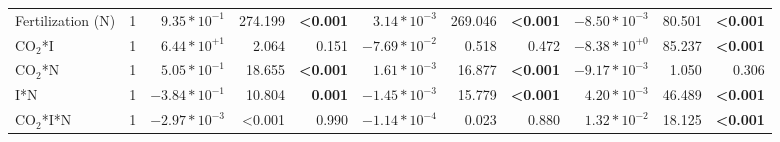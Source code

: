 \begin{landscape}
\begin{table}
{\begin{tabular}{p{3cm}p{0.5cm}p{1.75cm}p{1.5cm}p{1.5cm}p{1.75cm}p{1.5cm}p{1.5cm}p{1.75cm}p{1.5cm}p{1.5cm}}
            Fertilization (N) & \multicolumn{1}{r}{1}
            & \multicolumn{1}{r}{$9.35*10^{-1}$}      & \multicolumn{1}{r}{274.199}       & \multicolumn{1}{r}{\textbf{<0.001}}
            & \multicolumn{1}{r}{$3.14*10^{-3}$}      & \multicolumn{1}{r}{269.046}       & \multicolumn{1}{r}{\textbf{<0.001}}
            & \multicolumn{1}{r}{$-8.50*10^{-3}$}     & \multicolumn{1}{r}{80.501}        & \multicolumn{1}{r}{\textbf{<0.001}} 
            \\

            CO$_2$*I & \multicolumn{1}{r}{1}
            & \multicolumn{1}{r}{$6.44*10^{+1}$}      & \multicolumn{1}{r}{2.064}         & \multicolumn{1}{r}{0.151}
            & \multicolumn{1}{r}{$-7.69*10^{-2}$}   & \multicolumn{1}{r}{0.518}         & \multicolumn{1}{r}{0.472}
            & \multicolumn{1}{r}{$-8.38*10^{+0}$}     & \multicolumn{1}{r}{85.237}        & \multicolumn{1}{r}{\textbf{<0.001}} 
            \\

            CO$_2$*N & \multicolumn{1}{r}{1}
            & \multicolumn{1}{r}{$5.05*10^{-1}$}      & \multicolumn{1}{r}{18.655}        & \multicolumn{1}{r}{\textbf{<0.001}}
            & \multicolumn{1}{r}{$1.61*10^{-3}$}      & \multicolumn{1}{r}{16.877}        & \multicolumn{1}{r}{\textbf{<0.001}}
            & \multicolumn{1}{r}{$-9.17*10^{-3}$}     & \multicolumn{1}{r}{1.050}         & \multicolumn{1}{r}{0.306} 
            \\

            I*N & \multicolumn{1}{r}{1}
            & \multicolumn{1}{r}{$-3.84*10^{-1}$}     & \multicolumn{1}{r}{10.804}        & \multicolumn{1}{r}{\textbf{0.001}}
            & \multicolumn{1}{r}{$-1.45*10^{-3}$}     & \multicolumn{1}{r}{15.779}        & \multicolumn{1}{r}{\textbf{<0.001}}
            & \multicolumn{1}{r}{$4.20*10^{-3}$}      & \multicolumn{1}{r}{46.489}        & \multicolumn{1}{r}{\textbf{<0.001}} 
            \\

            CO$_2$*I*N & \multicolumn{1}{r}{1}
            & \multicolumn{1}{r}{$-2.97*10^{-3}$}     & \multicolumn{1}{r}{<0.001}        & \multicolumn{1}{r}{0.990}
            & \multicolumn{1}{r}{$-1.14*10^{-4}$}     & \multicolumn{1}{r}{0.023}         & \multicolumn{1}{r}{0.880}
            & \multicolumn{1}{r}{$1.32*10^{-2}$}      & \multicolumn{1}{r}{18.125}        & \multicolumn{1}{r}{\textbf{<0.001}} 
            \\
            \hline


\end{tabular}}
\end{table}
\end{landscape}
